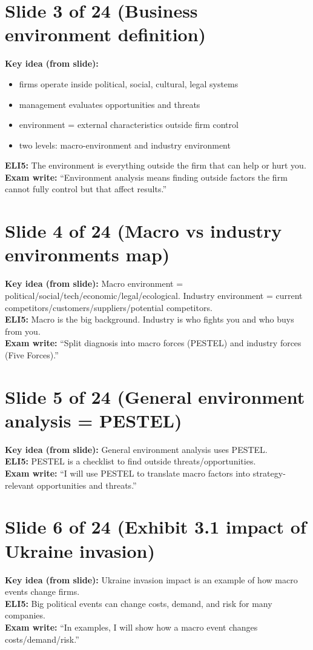 \documentclass[11pt,a4paper]{article}
\begin{document}
\section*{Slide 3 of 24 (Business environment definition)}
\textbf{Key idea (from slide):}
\begin{itemize}
  \item firms operate inside political, social, cultural, legal systems
  \item management evaluates opportunities and threats
  \item environment = external characteristics outside firm control
  \item two levels: macro-environment and industry environment
\end{itemize}
\textbf{ELI5:} The environment is everything outside the firm that can help or hurt you.\\
\textbf{Exam write:} ``Environment analysis means finding outside factors the firm cannot fully control but that affect results.''

\section*{Slide 4 of 24 (Macro vs industry environments map)}
\textbf{Key idea (from slide):} Macro environment = political/social/tech/economic/legal/ecological. Industry environment = current competitors/customers/suppliers/potential competitors.\\
\textbf{ELI5:} Macro is the big background. Industry is who fights you and who buys from you.\\
\textbf{Exam write:} ``Split diagnosis into macro forces (PESTEL) and industry forces (Five Forces).''

\section*{Slide 5 of 24 (General environment analysis = PESTEL)}
\textbf{Key idea (from slide):} General environment analysis uses PESTEL.\\
\textbf{ELI5:} PESTEL is a checklist to find outside threats/opportunities.\\
\textbf{Exam write:} ``I will use PESTEL to translate macro factors into strategy-relevant opportunities and threats.''

\section*{Slide 6 of 24 (Exhibit 3.1 impact of Ukraine invasion)}
\textbf{Key idea (from slide):} Ukraine invasion impact is an example of how macro events change firms.\\
\textbf{ELI5:} Big political events can change costs, demand, and risk for many companies.\\
\textbf{Exam write:} ``In examples, I will show how a macro event changes costs/demand/risk.''
\end{document}
